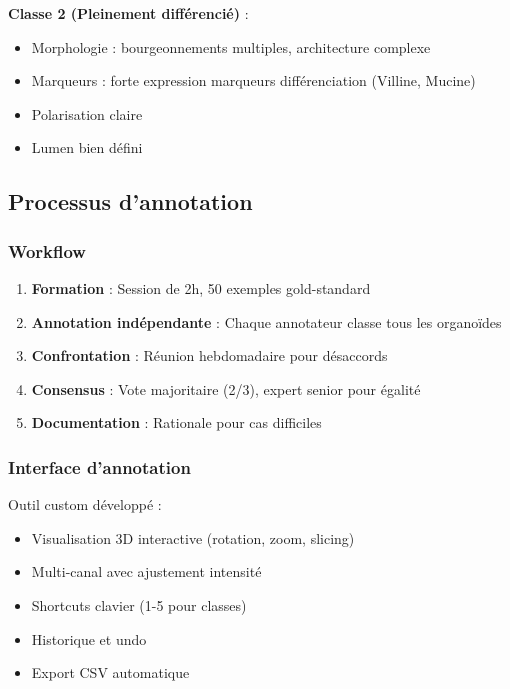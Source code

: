 \textbf{Classe 2 (Pleinement différencié)} :
\begin{itemize}
    \item Morphologie : bourgeonnements multiples, architecture complexe
    \item Marqueurs : forte expression marqueurs différenciation (Villine, Mucine)
    \item Polarisation claire
    \item Lumen bien défini
\end{itemize}

\subsection{Processus d'annotation}

\subsubsection{Workflow}

\begin{enumerate}
    \item \textbf{Formation} : Session de 2h, 50 exemples gold-standard
    \item \textbf{Annotation indépendante} : Chaque annotateur classe tous les organoïdes
    \item \textbf{Confrontation} : Réunion hebdomadaire pour désaccords
    \item \textbf{Consensus} : Vote majoritaire (2/3), expert senior pour égalité
    \item \textbf{Documentation} : Rationale pour cas difficiles
\end{enumerate}

\subsubsection{Interface d'annotation}

Outil custom développé :
\begin{itemize}
    \item Visualisation 3D interactive (rotation, zoom, slicing)
    \item Multi-canal avec ajustement intensité
    \item Shortcuts clavier (1-5 pour classes)
    \item Historique et undo
    \item Export CSV automatique
\end{itemize}

